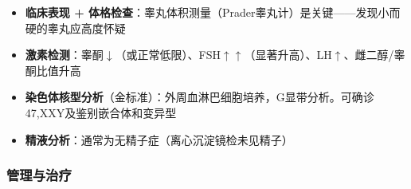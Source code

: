\begin{itemize}[leftmargin=2cm]
	\item \textbf{临床表现 + 体格检查}：睾丸体积测量（Prader睾丸计）是关键——发现小而硬的睾丸应高度怀疑
	\item \textbf{激素检测}：睾酮$\downarrow$（或正常低限）、FSH$\uparrow\uparrow$（显著升高）、LH$\uparrow$、雌二醇/睾酮比值升高
	\item \textbf{染色体核型分析}（金标准）：外周血淋巴细胞培养，G显带分析。可确诊47,XXY及鉴别嵌合体和变异型
	\item \textbf{精液分析}：通常为无精子症（离心沉淀镜检未见精子）
\end{itemize}

\subsubsection{管理与治疗}

